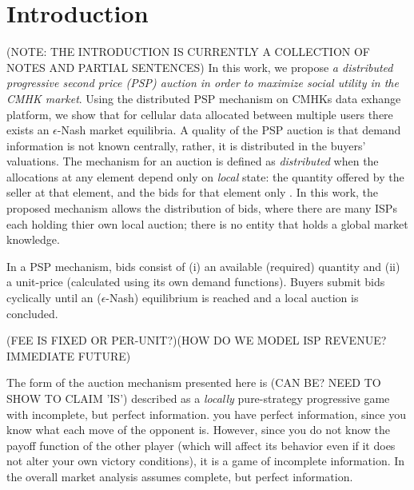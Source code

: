 \documentclass[sigconf, anonymous]{acmart}
\theoremstyle{definition}
\begin{document}

\fi
\maketitle

\section{Introduction}

(NOTE: THE INTRODUCTION IS CURRENTLY A COLLECTION OF NOTES AND PARTIAL
SENTENCES)
In this work, we propose \emph{a distributed progressive second price (PSP) auction in
order to maximize social utility in the CMHK market}. Using the
distributed PSP mechanism on CMHKs data
exhange platform, we show that for cellular data allocated between multiple users there
exists an $\epsilon$-Nash market equilibria. A quality of the PSP auction is that
demand information is not known centrally, rather, it is distributed in the
buyers' valuations. The mechanism for an auction is defined
as \emph{distributed} when the allocations at any element depend only on
\emph{local} state: the quantity offered by the seller at that element, and the
bids for that element only \cite{lazar}. In this work, the proposed mechanism
allows the distribution of bids, where there are many ISPs each holding
thier own local auction; there is no entity that holds a global market knowledge.

In a PSP mechanism, bids consist of (i) an available (required) quantity and (ii) a unit-price (calculated
using its own demand functions). Buyers submit bids cyclically until an
($\epsilon$-Nash) equilibrium is reached and a local auction is concluded. 

(FEE IS FIXED OR
PER-UNIT?)(HOW DO WE MODEL ISP REVENUE? IMMEDIATE FUTURE)

The form of the auction mechanism presented here is (CAN BE? NEED TO SHOW TO
CLAIM 'IS') described as a \emph{locally}
pure-strategy progressive game with incomplete, but perfect information.
 you have perfect information, since you know what each move of the opponent is.
However, since you do not know the payoff function of the other player (which
will affect its behavior even if it does not alter your own victory conditions),
it is a game of incomplete information.
In the overall market analysis assumes complete, but perfect information.
 
\end{document}
